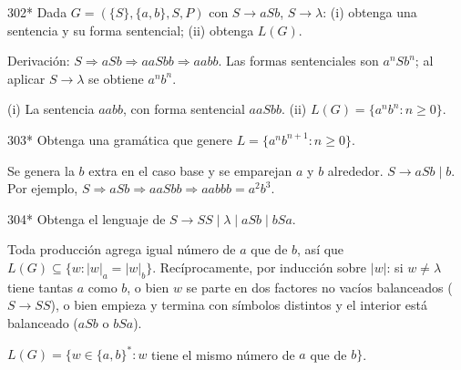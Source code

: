 \documentclass[11pt]{article}
\begin{document}


\begin{ejercicio}{302}{*}
Dada $G = (\{S\}, \{a, b\}, S, P)$ con $S \to aSb$, $S \to \lambda$: (i) obtenga una sentencia y su forma sentencial; (ii) obtenga $L(G)$.
\end{ejercicio}
\proc Derivación: $S \Rightarrow aSb \Rightarrow aaSbb \Rightarrow aabb$. Las formas sentenciales son $a^nSb^n$; al aplicar $S \to \lambda$ se obtiene $a^nb^n$.

\resp (i) La sentencia $aabb$, con forma sentencial $aaSbb$. (ii) $L(G) = \{a^nb^n : n \ge 0\}$.


\begin{ejercicio}{303}{*}
Obtenga una gramática que genere $L = \{a^nb^{n+1} : n \ge 0\}$.
\end{ejercicio}
\proc Se genera la $b$ extra en el caso base y se emparejan $a$ y $b$ alrededor.
\resp $S \to aSb \mid b$. Por ejemplo, $S \Rightarrow aSb \Rightarrow aaSbb \Rightarrow aabbb = a^2b^3$.



\begin{ejercicio}{304}{*}
Obtenga el lenguaje de $S \to SS \mid \lambda \mid aSb \mid bSa$.
\end{ejercicio}
\proc Toda producción agrega igual número de $a$ que de $b$, así que $L(G) \subseteq \{w : |w|_a = |w|_b\}$. Recíprocamente, por inducción sobre $|w|$: si $w \ne \lambda$ tiene tantas $a$ como $b$, o bien $w$ se parte en dos factores no vacíos balanceados ($S \to SS$), o bien empieza y termina con símbolos distintos y el interior está balanceado ($aSb$ o $bSa$).

\resp $L(G) = \{w \in \{a, b\}^* : w$ tiene el mismo número de $a$ que de $b\}$.
\end{document}
